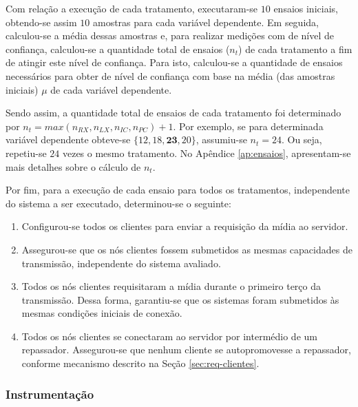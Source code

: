 Com relação a execução de cada tratamento, executaram-se $10$ ensaios iniciais, obtendo-se assim $10$ amostras para cada variável dependente. Em seguida, calculou-se a média dessas amostras e, para realizar medições com  de nível de confiança, calculou-se a quantidade total de ensaios ($n_t$) de cada tratamento a fim de atingir este nível de confiança.
Para isto, calculou-se a quantidade de ensaios necessários para obter  de nível de confiança com base na média (das amostras iniciais) $\mu$ de cada variável dependente. 

Sendo assim, a quantidade total de ensaios de cada tratamento foi determinado por 
$n_t = max(n_{RX}, n_{LX}, n_{IC}, n_{PC}) + 1$. Por exemplo, se para determinada variável dependente obteve-se $\{12, 18, \textbf{23}, 20\}$, assumiu-se $n_t = 24$. Ou seja, repetiu-se $24$ vezes o mesmo tratamento.
No Apêndice \ref{ap:ensaios}, apresentam-se mais detalhes sobre o cálculo de $n_t$.

Por fim, para a execução de cada ensaio para todos os tratamentos, independente do sistema a ser executado, determinou-se o seguinte:

\begin{enumerate}
  \item Configurou-se todos os clientes para enviar a requisição da mídia ao servidor. 
  
  \item Assegurou-se que os nós clientes fossem submetidos as mesmas capacidades de transmissão, independente do sistema avaliado. 

  \item Todos os nós clientes requisitaram a mídia durante o primeiro terço da transmissão. Dessa forma, garantiu-se que os sistemas foram submetidos às mesmas condições iniciais de conexão.
  
  \item Todos os nós clientes se conectaram ao servidor por intermédio de um repassador. 
  Assegurou-se que nenhum cliente se autopromovesse a repassador, conforme mecanismo descrito na Seção \ref{sec:req-clientes}.
  
\end{enumerate}

\subsubsection{Instrumentação}

